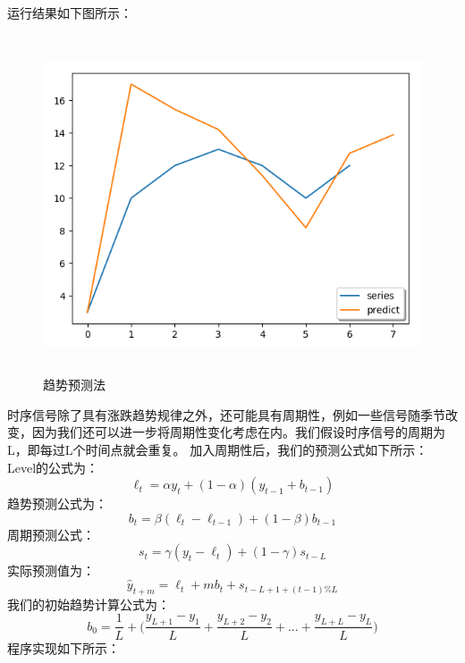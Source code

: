 \documentclass{article}
\begin{document}
运行结果如下图所示：
\begin{figure}[H]
	\caption{趋势预测法}
	\label{f000071}
	\centering
	\includegraphics[height=10cm]{images/f000071}
\end{figure}
时序信号除了具有涨跌趋势规律之外，还可能具有周期性，例如一些信号随季节改变，因为我们还可以进一步将周期性变化考虑在内。我们假设时序信号的周期为L，即每过L个时间点就会重复。\newline
加入周期性后，我们的预测公式如下所示：
Level的公式为：
\begin{equation}
\ell _{t} = \alpha y_{t} + (1-\alpha)(y_{t-1} + b_{t-1})
\label{e000099}
\end{equation}
趋势预测公式为：
\begin{equation}
b_{t} = \beta (\ell _{t} - \ell _{t-1}) + (1-\beta)b_{t-1}
\label{e000100}
\end{equation}
周期预测公式：
\begin{equation}
s_{t} = \gamma (y_{t} - \ell _{t}) + (1-\gamma)s_{t-L}
\label{e000101}
\end{equation}
实际预测值为：
\begin{equation}
\hat{y}_{t+m}=\ell _{t} + mb_{t} + s_{t-L+1+(t-1)\%L}
\label{e000102}
\end{equation}
我们的初始趋势计算公式为：
\begin{equation}
b_{0}=\frac{1}{L} +\bigg(  \frac{y_{L+1}-y_{1}}{L} + \frac{y_{L+2}-y_{2}}{L} + ... + \frac{y_{L+L}-y_{L}}{L} \bigg)
\label{e000103}
\end{equation}
程序实现如下所示：
\end{document}

